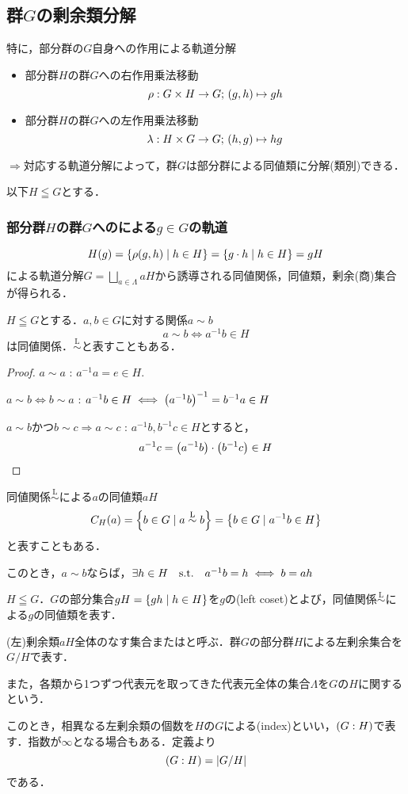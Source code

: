 \documentclass[main]{subfiles}
\begin{document}
	\subsection{群$G$の剰余類分解}
		特に，部分群の$G$自身への作用による軌道分解
		\begin{itemize}
			\item 部分群$H$の群$G$への右作用乗法移動
				\[\rho:G\times H\to G;\,\qty(g,h)\mapsto gh\]
			\item 部分群$H$の群$G$への左作用乗法移動
				\[\lambda:H\times G\to G;\,\qty(h,g)\mapsto hg\]
		\end{itemize}
		$\Rightarrow$対応する軌道分解によって，群$G$は部分群による同値類に分解(類別)できる．

		以下$H\leqq G$とする．
		\subsubsection{部分群$H$の群$G$へのによる$g\in G$の軌道}
			\[H\qty(g)=\qty{\rho\qty(g,h)\mid h\in H}=\qty{g\cdot h\mid h\in H}=gH\]
			による軌道分解$G=\bigsqcup_{a\in\Lambda}aH$から誘導される同値関係，同値類，剰余(商)集合が得られる．

			\begin{prop}
				$H\leqq G$とする．$a,b\in G$に対する関係$a\sim b$
				\[a\sim b\iff a^{-1}b\in H\]
				は同値関係．$\stackrel{\text{L}}{\sim}$と表すこともある．
			\end{prop}
			\begin{proof}
				$a\sim a$ : $a^{-1}a=e\in H.$

				$a\sim b\iff b\sim a$ : $a^{-1}b\in H\iff\qty(a^{-1}b)^{-1}=b^{-1}a\in H$

				$a\sim b$かつ$b\sim c\Rightarrow a\sim c$ : $a^{-1}b,b^{-1}c\in H$とすると，
				\[a^{-1}c=\qty(a^{-1}b)\cdot \qty(b^{-1}c)\in H\]
			\end{proof}
			\begin{note*}
				同値関係$\stackrel{\text{L}}{\sim}$による$a$の同値類$aH$
				\[C_H\qty(a)=\qty{b\in G\mid a\stackrel{\text{L}}{\sim}b}=\qty{b\in G\mid a^{-1}b\in H}\]
				と表すこともある．
			\end{note*}
			このとき，$a\sim b$ならば，$\exists h\in H\text{\quad s.t.\quad} a^{-1}b=h\iff b=ah$
			\begin{dfn}
				$H\leqq G$．$G$の部分集合$gH=\qty{gh\mid h\in H}$を$g$の(left coset)とよび，同値関係$\stackrel{\text{L}}{\sim}$による$g$の同値類を表す．
			\end{dfn}
			\begin{dfn}
				(左)剰余類$aH$全体のなす集合またはと呼ぶ．群$G$の部分群$H$による左剰余集合を$G/H$で表す．

				また，各類から1つずつ代表元を取ってきた代表元全体の集合$\Lambda$を$G$の$H$に関する\redunderline{左完全代表系}という．
			\end{dfn}
			このとき，相異なる左剰余類の個数を$H$の$G$による(index)といい，$\qty(G:H)$で表す．指数が$\infty$となる場合もある．定義より
			\[\qty(G:H)=\qty|G/H|\]
			である．
\end{document}
